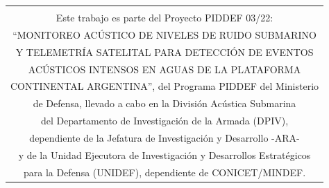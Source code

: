 

\vspace*{170pt}

\begin{center}
	\begin{tabular}[c]{c}
		\hline\hline
		\\
		\Large{Este trabajo es parte del Proyecto PIDDEF 03/22:}\vspace{2mm}\\
		\Large{“MONITOREO ACÚSTICO DE NIVELES DE RUIDO SUBMARINO}\vspace{2mm}\\
		\Large{Y TELEMETRÍA SATELITAL PARA DETECCIÓN DE EVENTOS}\vspace{2mm}\\
		\Large{ACÚSTICOS INTENSOS EN AGUAS DE LA PLATAFORMA}\vspace{2mm}\\
		\Large{CONTINENTAL ARGENTINA”, del Programa PIDDEF del Ministerio}\vspace{2mm}\\
		\Large{de Defensa, llevado a cabo en la División Acústica Submarina}\vspace{2mm}\\
		\Large{del Departamento de Investigación de la Armada (DPIV),}\vspace{2mm}\\
		\Large{dependiente de la Jefatura de Investigación y Desarrollo -ARA-}\vspace{2mm}\\
		\Large{y de la Unidad Ejecutora de Investigación y Desarrollos Estratégicos}\vspace{2mm}\\
		\Large{para la Defensa (UNIDEF), dependiente de CONICET/MINDEF.}\vspace{8mm}\\
		\hline\hline
	\end{tabular}
\end{center}

\clearpage


